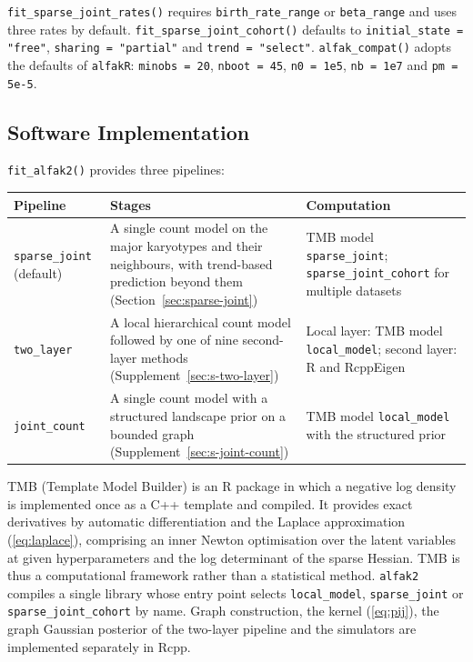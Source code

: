 \documentclass[11pt]{article}
\begin{document}
\begin{sloppypar}
\texttt{fit\_sparse\_joint\_rates()} requires \texttt{birth\_rate\_range} or
\texttt{beta\_range} and uses three rates by default. \texttt{fit\_sparse\_joint\_cohort()} defaults to
\texttt{initial\_state = "free"}, \texttt{sharing = "partial"} and
\texttt{trend = "select"}. \texttt{alfak\_compat()} adopts the defaults of
\texttt{alfakR}: \texttt{minobs = 20}, \texttt{nboot = 45},
\texttt{n0 = 1e5}, \texttt{nb = 1e7} and \texttt{pm = 5e-5}.
\end{sloppypar}

\subsection{Software Implementation}
\label{sec:structure}

\texttt{fit\_alfak2()} provides three pipelines:

\begin{center}
\begin{tabular}{L{0.2\textwidth}L{0.4\textwidth}L{0.3\textwidth}}
\toprule
Pipeline & Stages & Computation \\
\midrule
\texttt{sparse\_joint} (default) & A single count model on the major
karyotypes and their neighbours, with trend-based prediction beyond them
(Section~\ref{sec:sparse-joint}) & TMB model \texttt{sparse\_joint};
\texttt{sparse\_joint\_cohort} for multiple datasets \\
\texttt{two\_layer} & A local hierarchical count model followed by one of nine
second-layer methods (Supplement~\ref{sec:s-two-layer}) & Local layer: TMB
model \texttt{local\_model}; second layer: R and RcppEigen \\
\texttt{joint\_count} & A single count model with a structured landscape prior
on a bounded graph (Supplement~\ref{sec:s-joint-count}) & TMB model
\texttt{local\_model} with the structured prior \\
\bottomrule
\end{tabular}
\end{center}

TMB (Template Model Builder) is an R package in which a negative log density
is implemented once as a C++ template and compiled. It provides exact
derivatives by automatic differentiation and the Laplace approximation
(\ref{eq:laplace}), comprising an inner Newton optimisation over the latent
variables at given hyperparameters and the log determinant of the sparse
Hessian. TMB is thus a computational framework rather than a statistical
method. \texttt{alfak2} compiles a single library whose entry point selects
\texttt{local\_model}, \texttt{sparse\_joint} or \texttt{sparse\_joint\_cohort}
by name. Graph construction, the kernel (\ref{eq:pij}), the graph Gaussian
posterior of the two-layer pipeline and the simulators are implemented
separately in Rcpp.
\end{document}
